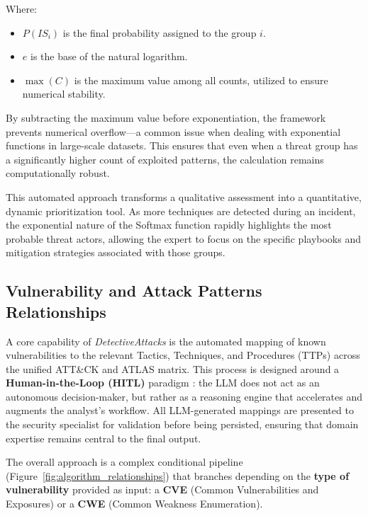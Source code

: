 \documentclass[conference]{IEEEtran}
\begin{document}
Where:
\begin{itemize}
    \item $P(IS_i)$ is the final probability assigned to the group $i$.
    \item $e$ is the base of the natural logarithm.
    \item $\max(C)$ is the maximum value among all counts, utilized to ensure numerical stability.
\end{itemize}

By subtracting the maximum value before exponentiation, the framework prevents numerical overflow—a common issue when dealing with exponential functions in large-scale datasets. This ensures that even when a threat group has a significantly higher count of exploited patterns, the calculation remains computationally robust.

This automated approach transforms a qualitative assessment into a quantitative, dynamic prioritization tool. As more techniques are detected during an incident, the exponential nature of the Softmax function rapidly highlights the most probable threat actors, allowing the expert to focus on the specific playbooks and mitigation strategies associated with those groups.

\subsection{Vulnerability and Attack Patterns Relationships}

A core capability of \textit{DetectiveAttacks} is the automated mapping of known vulnerabilities to the relevant Tactics, Techniques, and Procedures (TTPs) across the unified ATT\&CK and ATLAS matrix. This process is designed around a \textbf{Human-in-the-Loop (HITL)} paradigm \cite{Calvano2025}: the LLM does not act as an autonomous decision-maker, but rather as a reasoning engine that accelerates and augments the analyst's workflow. All LLM-generated mappings are presented to the security specialist for validation before being persisted, ensuring that domain expertise remains central to the final output.

The overall approach is a complex conditional pipeline (Figure~\ref{fig:algorithm_relationships}) that branches depending on the \textbf{type of vulnerability} provided as input: a \textbf{CVE} (Common Vulnerabilities and Exposures) or a \textbf{CWE} (Common Weakness Enumeration).
\end{document}
